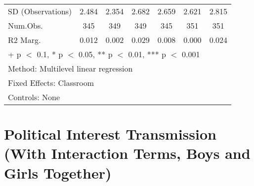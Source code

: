 \documentclass[
  letterpaper,
  DIV=11,
  numbers=noendperiod]{scrreprt}
\begin{document}
\begin{table}
\begin{tabular}[t]{lcccccc}
\hspace{1em}SD (Observations) & 2.484 & 2.354 & 2.682 & 2.659 & 2.621 & 2.815\\
\hspace{1em}Num.Obs. & 345 & 349 & 349 & 345 & 351 & 351\\
\hspace{1em}R2 Marg. & 0.012 & 0.002 & 0.029 & 0.008 & 0.000 & 0.024\\
\bottomrule
\multicolumn{7}{l}{\rule{0pt}{1em}+ p $<$ 0.1, * p $<$ 0.05, ** p $<$ 0.01, *** p $<$ 0.001}\\
\multicolumn{7}{l}{\rule{0pt}{1em}Method: Multilevel linear regression}\\
\multicolumn{7}{l}{\rule{0pt}{1em}Fixed Effects: Classroom}\\
\multicolumn{7}{l}{\rule{0pt}{1em}Controls: None}\\
\end{tabular}
\end{table}

\chapter{Political Interest Transmission (With Interaction Terms, Boys
and Girls Together)}\label{sec-appendix5}
\end{document}
